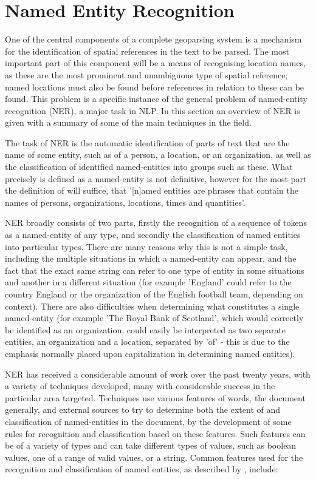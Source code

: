 \documentclass[12pt, a4paper]{report}
\begin{document}
\section{Named Entity Recognition}
\label{sec_ner}

One of the central components of a complete geoparsing system is a mechanism for the identification of spatial references in the text to be parsed. The most important part of this component will be a means of recognising location names, as these are the most prominent and unambiguous type of spatial reference; named locations must also be found before references in relation to these can be found. This problem is a specific instance of the general problem of named-entity recognition (NER), a major task in NLP. In this section an overview of NER is given with a summary of some of the main techniques in the field.

The task of NER is the automatic identification of parts of text that are the name of some entity, such as of a person, a location, or an organization, as well as the classification of identified named-entities into groups such as these. What precisely is defined as a named-entity is not definitive, however for the most part the definition of \citet{conll2002} will suffice, that '[n]amed entities are phrases that contain the names of persons, organizations, locations, times and quantities'. %

NER broadly consists of two parts, firstly the recognition of a sequence of tokens as a named-entity of any type, and secondly the classification of named entities into particular types. There are many reasons why this is not a simple task, including the multiple situations in which a named-entity can appear, and the fact that the exact same string can refer to one type of entity in some situations and another in a different situation (for example 'England' could refer to the country England or the organization of the English football team, depending on context). There are also difficulties when determining what constitutes a single named-entity (for example 'The Royal Bank of Scotland', which would correctly be identified as an organization, could easily be interpreted as two separate entities, an organization and a location, separated by 'of' - this is due to the emphasis normally placed upon capitalization in determining named entities).

NER has received a considerable amount of work over the past twenty years, with a variety of techniques developed, many with considerable success in the particular area targeted. Techniques use various features of words, the document generally, and external sources to try to determine both the extent of and classification of named-entities in the document, by the development of some rules for recognition and classification based on these features. Such features can be of a variety of types and can take different types of values, such as boolean values, one of a range of valid values, or a string. Common features used for the recognition and classification of named entities, as described by \citet{nadeau2009}, include:
\end{document}
